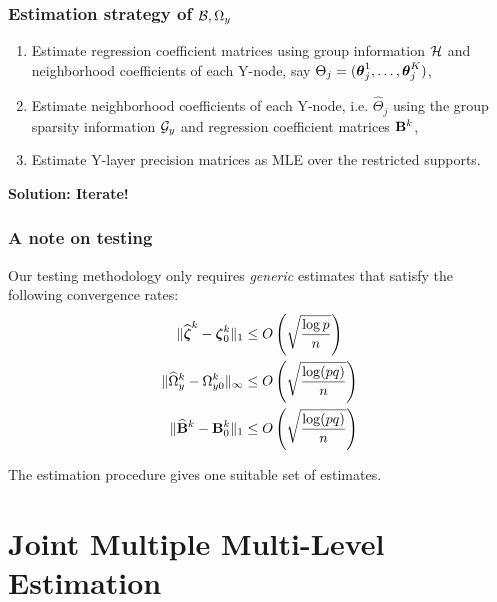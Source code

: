 \documentclass[10pt]{beamer}
\theoremstyle{definition}
\newcommand{\colubf}{\color{UniBlue}\bf}
\begin{document}
\begin{frame}
\frametitle{Estimation strategy of ${\cal{B}}, \Omega_y$}

\begin{enumerate}
\item Estimate {\colb regression coefficient matrices} using group information ${\cal{H}}$ and { \colr neighborhood coefficients} of each Y-node, say $\Theta_j = ({\boldsymbol{\theta}}_j^1, \ldots, {\boldsymbol{\theta}}_j^K)$,
\vspace{1em}
\item Estimate {\colb neighborhood coefficients} of each Y-node, i.e. $\widehat \Theta_j$ using the group sparsity information ${\cal{G}}_y$ and {\colr regression coefficient matrices} ${\mathbf{B}}^k$,
\vspace{1em}
\item Estimate Y-layer precision matrices as MLE over the restricted supports.
\end{enumerate}

\vspace{1em}
\begin{center}
{\colubf Solution: Iterate!}
\end{center}

\end{frame}

\begin{frame}
\frametitle{A note on testing}

Our testing methodology only requires {\it generic} estimates that satisfy the following convergence rates:
%
\begin{align*}
\| \widehat {{\boldsymbol{\zeta}}}^k - {\boldsymbol{\zeta}}_0^k \|_1 & \leq O \left( \sqrt { \frac{\log p}{n}} \right)\\
\| \widehat \Omega_y^k - \Omega_{y0}^k \|_\infty & \leq O \left( \sqrt { \frac{\log (pq)}{n}} \right)\\
\| \widehat {{\mathbf{B}}}^k - {\mathbf{B}}^k_0 \|_1 & \leq O \left( \sqrt { \frac{\log (p q)}{n}} \right)
\end{align*}
%

The estimation procedure gives one suitable set of estimates.
\end{frame}

\section{Joint Multiple Multi-Level Estimation}
\end{document}
